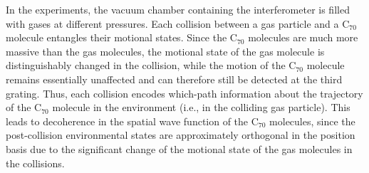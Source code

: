 \documentclass[12pt,aps,floatfix,amsmath,amssymb,showpacs,nofootinbib]{revtex4-2}
\begin{document}
In the experiments, the vacuum chamber containing the interferometer
is filled with gases at different pressures. Each collision between a
gas particle and a C$_{70}$ molecule entangles their motional states.
Since the C$_{70}$ molecules are much more massive than the gas
molecules, the motional state of the gas molecule is distinguishably
changed in the collision, while the motion of the C$_{70}$ molecule
remains essentially unaffected and can therefore still be detected at
the third grating. Thus, each collision encodes which-path information
about the trajectory of the C$_{70}$ molecule in the environment
(i.e., in the colliding gas particle). This leads to decoherence in
the spatial wave function of the C$_{70}$ molecules, since the
post-collision environmental states are approximately orthogonal in
the position basis due to the significant change of the motional state
of the gas molecules in the collisions.
\end{document}

